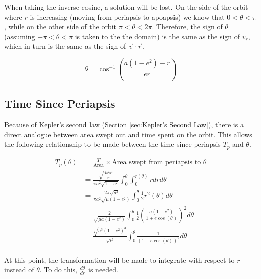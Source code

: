 \documentclass{article}
\begin{document}
When taking the inverse cosine, a solution will be lost. On the side of the orbit where $r$ is increasing (moving from periapsis to apoapsis) we know that $0<\theta<\pi$, while on the other side of the orbit $\pi<\theta<2\pi$. Therefore, the sign of $\theta$ (assuming $-\pi<\theta<\pi$ is taken to the the domain) is the same as the sign of $v_r$, which in turn is the same as the sign of $\vec{v}\cdot\vec{r}$.

\begin{equation}\label{True Anomoly Geometric}
    \theta=\cos^{-1}\left(\frac{a(1-e^2)-r}{er}\right)
\end{equation}

\bigskip\bigskip
\subsection{Time Since Periapsis}\label{sec:time}

Because of Kepler's second law (Section \ref{sec:Kepler's Second Law}), there is a direct analogue between area swept out and time spent on the orbit. This allows the following relationship to be made between the time since periapsis $T_p$ and $\theta$.

\begin{align*}
    T_p(\theta) & = \frac{T}{\text{Area}}\times\text{Area swept from periapsis to }\theta                                           \\
                & = \frac{\sqrt{\frac{4\pi^2a^3}{\mu}}}{\pi{}a^2\sqrt{1-e^2}}\int_{0}^{\theta}\int_{0}^{r(\theta)}rdr d\theta       \\
                & = \frac{2\pi\sqrt{a^3}}{\pi{}a^2\sqrt{\mu(1-e^2)}}\int_{0}^{\theta}\frac{1}{2}r^2(\theta)d\theta                  \\
                & = \frac{2}{\sqrt{\mu a(1-e^2)}}\int_{0}^{\theta}\frac{1}{2}\left(\frac{a(1-e^2)}{1+e\cos(\theta)}\right)^2d\theta \\
                & = \frac{\sqrt{a^3(1-e^2)^3}}{\sqrt{\mu}}\int_{0}^{\theta}\frac{1}{(1+e\cos(\theta))^2}d\theta                     \\
\end{align*}

At this point, the transformation will be made to integrate with respect to $r$ instead of $\theta$. To do this, $\frac{d\theta}{dr}$ is needed.
\end{document}
